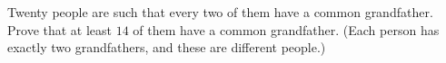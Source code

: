 Twenty people are such that every two of them have a common grandfather. Prove that at least $14$ of them have a common grandfather. (Each person has exactly two grandfathers, and these are different people.)
